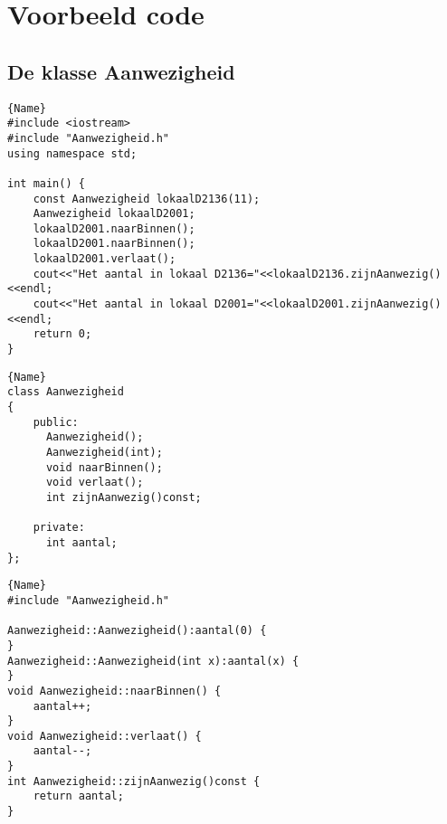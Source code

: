 \chapter{Voorbeeld code}
\section{De klasse Aanwezigheid}\label{cpt:klAanw}
\begin{lstlisting}[caption=Het werken met de klasse Aanwezigheid, frame=tlrb,label={lst:vbtstAanwezig}]{Name}
#include <iostream>
#include "Aanwezigheid.h"
using namespace std;

int main() {
	const Aanwezigheid lokaalD2136(11);
	Aanwezigheid lokaalD2001;
	lokaalD2001.naarBinnen();
	lokaalD2001.naarBinnen();
	lokaalD2001.verlaat();
	cout<<"Het aantal in lokaal D2136="<<lokaalD2136.zijnAanwezig()<<endl;
	cout<<"Het aantal in lokaal D2001="<<lokaalD2001.zijnAanwezig()<<endl;
	return 0;
}
\end{lstlisting}
\noindent\hspace{-1cm}\begin{minipage}{.43\textwidth}
	\begin{lstlisting}[caption=Aanwezigheid declaratie file(.h),frame=tlrb,label={lst:vbAanwezigH}]{Name}
class Aanwezigheid
{
	public:
	  Aanwezigheid();
	  Aanwezigheid(int);
	  void naarBinnen();
	  void verlaat();
	  int zijnAanwezig()const;
	
	private:
	  int aantal;
};
	\end{lstlisting}
\end{minipage}\hfill
\hspace{0.7cm}\begin{minipage}{.70\textwidth}
\begin{lstlisting}[caption=Aanwezigheid implementatie file(.cpp),frame=tlrb,label={lst:vbAanwezigCPP}]{Name}
#include "Aanwezigheid.h"

Aanwezigheid::Aanwezigheid():aantal(0) {
}
Aanwezigheid::Aanwezigheid(int x):aantal(x) {
}
void Aanwezigheid::naarBinnen() {
	aantal++;
}
void Aanwezigheid::verlaat() {
	aantal--;
}
int Aanwezigheid::zijnAanwezig()const {
	return aantal;
}
\end{lstlisting}
\end{minipage}
\newpage
